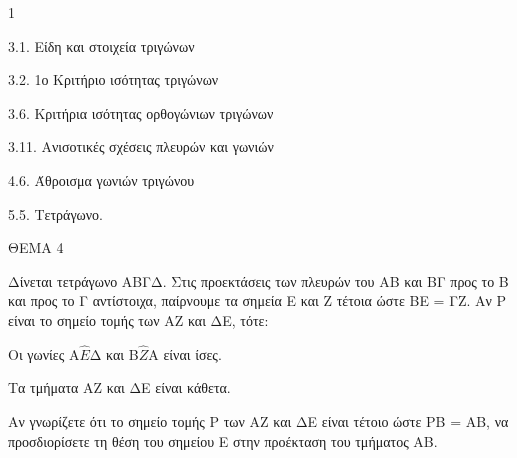 \begin{ylh}{1}
    \item 3.1. Είδη και στοιχεία τριγώνων
    \item 3.2. 1ο Κριτήριο ισότητας τριγώνων
    \item 3.6. Κριτήρια ισότητας ορθογώνιων τριγώνων
    \item 3.11. Ανισοτικές σχέσεις πλευρών και γωνιών
    \item 4.6. Άθροισμα γωνιών τριγώνου
    \item 5.5. Τετράγωνο.
\end{ylh}

ΘΕΜΑ 4

Δίνεται τετράγωνο ΑΒΓΔ. Στις προεκτάσεις των πλευρών του ΑΒ και ΒΓ προς το Β και προς το Γ αντίστοιχα, παίρνουμε τα σημεία Ε και Ζ τέτοια ώστε ΒΕ = ΓΖ. Αν Ρ είναι το σημείο τομής των ΑΖ και ΔΕ, τότε:

\begin{alist}
\item Να αποδείξετε ότι:

.}
\end{alist}
\begin{alist}
\item
  Οι γωνίες Α$\widehat{Ε}$Δ και Β$\widehat{Ζ}$Α είναι ίσες.
\item
  Τα τμήματα ΑΖ και ΔΕ είναι κάθετα.


\item Αν γνωρίζετε ότι το σημείο τομής Ρ των ΑΖ και ΔΕ είναι τέτοιο ώστε ΡΒ = ΑΒ, να προσδιορίσετε τη θέση του σημείου Ε στην προέκταση του τμήματος ΑΒ. 
\end{alist}
